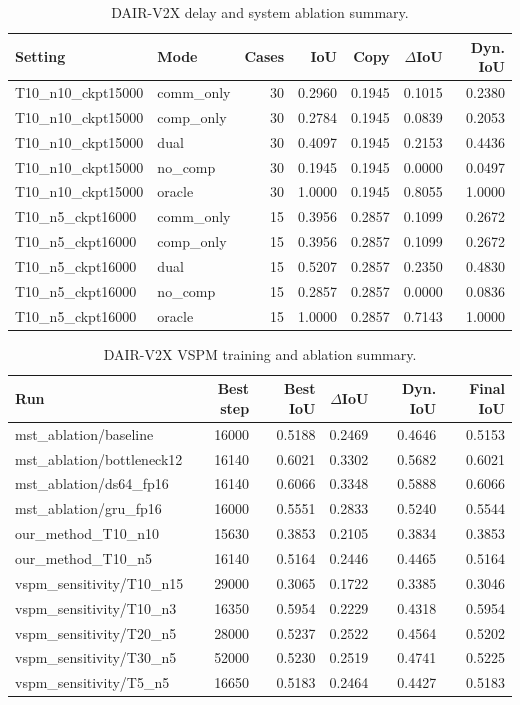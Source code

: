 \begin{table}[t]
\centering
\caption{DAIR-V2X delay and system ablation summary.}
\label{tab:dair-delay-system}
\begin{tabular}{llrrrrr}
\toprule
Setting & Mode & Cases & IoU & Copy & $\Delta$IoU & Dyn. IoU \\
\midrule
T10\_n10\_ckpt15000 & comm\_only & 30 & 0.2960 & 0.1945 & 0.1015 & 0.2380 \\
T10\_n10\_ckpt15000 & comp\_only & 30 & 0.2784 & 0.1945 & 0.0839 & 0.2053 \\
T10\_n10\_ckpt15000 & dual & 30 & 0.4097 & 0.1945 & 0.2153 & 0.4436 \\
T10\_n10\_ckpt15000 & no\_comp & 30 & 0.1945 & 0.1945 & 0.0000 & 0.0497 \\
T10\_n10\_ckpt15000 & oracle & 30 & 1.0000 & 0.1945 & 0.8055 & 1.0000 \\
T10\_n5\_ckpt16000 & comm\_only & 15 & 0.3956 & 0.2857 & 0.1099 & 0.2672 \\
T10\_n5\_ckpt16000 & comp\_only & 15 & 0.3956 & 0.2857 & 0.1099 & 0.2672 \\
T10\_n5\_ckpt16000 & dual & 15 & 0.5207 & 0.2857 & 0.2350 & 0.4830 \\
T10\_n5\_ckpt16000 & no\_comp & 15 & 0.2857 & 0.2857 & 0.0000 & 0.0836 \\
T10\_n5\_ckpt16000 & oracle & 15 & 1.0000 & 0.2857 & 0.7143 & 1.0000 \\
\bottomrule
\end{tabular}
\end{table}

\begin{table}[t]
\centering
\caption{DAIR-V2X VSPM training and ablation summary.}
\label{tab:dair-vspm-training}
\begin{tabular}{lrrrrr}
\toprule
Run & Best step & Best IoU & $\Delta$IoU & Dyn. IoU & Final IoU \\
\midrule
mst\_ablation/baseline & 16000 & 0.5188 & 0.2469 & 0.4646 & 0.5153 \\
mst\_ablation/bottleneck12 & 16140 & 0.6021 & 0.3302 & 0.5682 & 0.6021 \\
mst\_ablation/ds64\_fp16 & 16140 & 0.6066 & 0.3348 & 0.5888 & 0.6066 \\
mst\_ablation/gru\_fp16 & 16000 & 0.5551 & 0.2833 & 0.5240 & 0.5544 \\
our\_method\_T10\_n10 & 15630 & 0.3853 & 0.2105 & 0.3834 & 0.3853 \\
our\_method\_T10\_n5 & 16140 & 0.5164 & 0.2446 & 0.4465 & 0.5164 \\
vspm\_sensitivity/T10\_n15 & 29000 & 0.3065 & 0.1722 & 0.3385 & 0.3046 \\
vspm\_sensitivity/T10\_n3 & 16350 & 0.5954 & 0.2229 & 0.4318 & 0.5954 \\
vspm\_sensitivity/T20\_n5 & 28000 & 0.5237 & 0.2522 & 0.4564 & 0.5202 \\
vspm\_sensitivity/T30\_n5 & 52000 & 0.5230 & 0.2519 & 0.4741 & 0.5225 \\
vspm\_sensitivity/T5\_n5 & 16650 & 0.5183 & 0.2464 & 0.4427 & 0.5183 \\
\bottomrule
\end{tabular}
\end{table}

